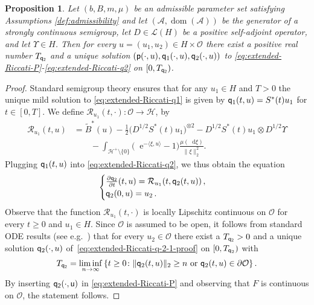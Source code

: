 \documentclass[10pt,a4paper,reqno]{amsart}
\DeclareMathOperator\dom{dom}
\newcommand*\D{\mathop{}\!\mathrm{d}}
\newcommand*\E{\mathop{}\!\mathrm{e}}
\numberwithin{equation}{section}
\newtheorem{proposition}[theorem]{Proposition}
\theoremstyle{plain}
\theoremstyle{definition}
\theoremstyle{example}
\newcommand{\cA}{\mathcal{A}}
\newcommand{\cH}{\mathcal{H}}
\newcommand{\cL}{\mathcal{L}}
\newcommand{\cO}{\mathcal{O}}
\newcommand{\cR}{\mathcal{R}}
\newcommand{\set}[1]{\left\{ #1\right\}}
\newcommand{\norm}[1]{\|#1\|}
\newcommand{\cHplus}{\cH^{+}}
\newcommand{\cHpluso}{\cHplus\setminus \{0\}}
\begin{document}
\begin{proposition}\label{prop:extended-Riccati-existence}
Let $(b,B,m,\mu)$ be an admissible parameter set satisfying Assumptions \ref{def:admissibility} and let $(\cA, \dom(\cA))$ be the
generator of a strongly continuous semigroup, let $D \in \cL(H)$ be a positive
self-adjoint operator, and let $\Upsilon \in H$. Then for every $u=(u_{1},u_{2})\in H\times \cO$ there
exist a positive real number $T_{\sf q_{2}}$ and a unique solution $({\sf p}(\cdot,u), {\sf q}_1(\cdot,u),
{\sf q}_2(\cdot,u))$ to \eqref{eq:extended-Riccati-P}-\eqref{eq:extended-Riccati-q2}
on $[0,T_{\sf q_{2}})$.
\end{proposition}
\begin{proof}
Standard semigroup theory ensures that for any $u_{1}\in H$ and $T>0$ the unique mild solution to
\eqref{eq:extended-Riccati-q1} is given by ${\sf q}_{1}(t,u)=S^*(t)u_{1}$ for $t\in
[0,T]$. We define $\cR_{u_1} (t, \cdot)\colon \cO \to \cH$, by 
\begin{align*}
\cR_{u_1}(t,u) &= 
\tilde{B}^{*}(u) 
-
\tfrac{1}{2}\big(D^{1/2}S^*(t)u_1\big)^{\otimes 2}- D^{1/2}S^*(t)u_1\otimes D^{1/2}\Upsilon \\
&\qquad - \int_{\cHpluso}\big(\E^{-\langle
    \xi,u\rangle}-1\big)\frac{\mu(\D \xi)}{\norm{\xi}_2^{2}}.
\end{align*}
Plugging ${\sf q}_{1}(t,u)$ into \eqref{eq:extended-Riccati-q2}, we thus obtain the equation
\begin{align}\label{eq:extended-Riccati-q-2-1-proof}
  \begin{cases}
    \frac{\partial {\sf q}_{2}}{\partial t}(t,u)= \cR_{u_1}(t,{\sf q}_2(t,u))\,,\\
    {\sf q}_{2}(0,u)=u_{2}\,. 
  \end{cases}
\end{align}
Observe that the function
$\cR_{u_{1}}(t,\cdot)$ is locally Lipschitz continuous on $\cO$ for every
$t\geq 0$ and $u_{1}\in H$. Since $\cO$ is assumed to be open, it follows from
standard ODE results (see
e.g.~\cite[Chapter 6, Proposition 1.2]{Mar76}) that for every $u_{2}\in\cO$ there exist a $T_{\sf q_{2}}>0$ and a unique solution
${\sf q}_{2}(\cdot,u)$ of~\eqref{eq:extended-Riccati-q-2-1-proof} on $[0,T_{{\sf q}_{2}})$ with
\begin{align*}
T_{\sf q_{2}}=\liminf_{n\to\infty}\set{t\geq 0\colon \norm{{\sf q}_{2}(t,u)}_2\geq
  n\text{ or }{\sf q}_{2}(t,u)\in\partial \cO}.
\end{align*}
By inserting $\sf q_2(\cdot,u)$ in  \eqref{eq:extended-Riccati-P} and observing that
$F$ is continuous on $\cO$, the statement follows.
\end{proof}
\end{document}
